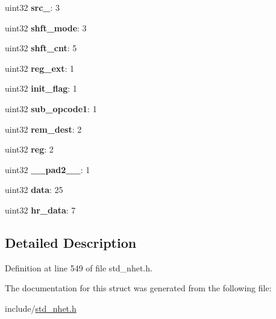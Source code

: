 \begin{DoxyCompactItemize}
\mbox{\label{structSUB__format_a9d47cb01ca41fb15b3fefaac91e0b069}} 
uint32 {\bfseries src\+\_}\+: 3
\item 
\mbox{\label{structSUB__format_ac2b76fb85fb63aa370ea3871f4c6e0c6}} 
uint32 {\bfseries shft\+\_\+mode}\+: 3
\item 
\mbox{\label{structSUB__format_a5011665cc07d860507d926fa3918f389}} 
uint32 {\bfseries shft\+\_\+cnt}\+: 5
\item 
\mbox{\label{structSUB__format_a8122175179a03292ef0625a234d8487e}} 
uint32 {\bfseries reg\+\_\+ext}\+: 1
\item 
\mbox{\label{structSUB__format_afd07173a7e17918ed4a0c4d8baa6c1e9}} 
uint32 {\bfseries init\+\_\+flag}\+: 1
\item 
\mbox{\label{structSUB__format_a220f82be748b8a86f6aabf3d71f283fe}} 
uint32 {\bfseries sub\+\_\+opcode1}\+: 1
\item 
\mbox{\label{structSUB__format_a361a2fbf84b365a769535be8e2ed662c}} 
uint32 {\bfseries rem\+\_\+dest}\+: 2
\item 
\mbox{\label{structSUB__format_a7b62e6b8d5a1a134eaf47f390ee0f44c}} 
uint32 {\bfseries reg}\+: 2
\item 
\mbox{\label{structSUB__format_a17436fb7753dccda5e04fc42020da9da}} 
uint32 {\bfseries \+\_\+\+\_\+pad2\+\_\+\+\_\+}\+: 1
\item 
\mbox{\label{structSUB__format_a3d01e45ede6351614568bee5557869ff}} 
uint32 {\bfseries data}\+: 25
\item 
\mbox{\label{structSUB__format_a48b55e74e435ecbfb09909048912dcd1}} 
uint32 {\bfseries hr\+\_\+data}\+: 7
\end{DoxyCompactItemize}


\subsection{Detailed Description}


Definition at line 549 of file std\+\_\+nhet.\+h.



The documentation for this struct was generated from the following file\+:\begin{DoxyCompactItemize}
\item 
include/\mbox{\hyperlink{std__nhet_8h}{std\+\_\+nhet.\+h}}\end{DoxyCompactItemize}
